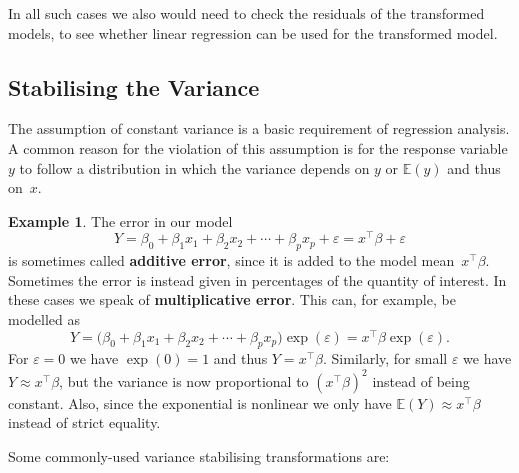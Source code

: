 \documentclass[
  a4paper,
]{article}
\theoremstyle{definition}
\theoremstyle{definition}
\newtheorem{example}{Example}[section]
\theoremstyle{definition}
\theoremstyle{definition}
\theoremstyle{remark}
\begin{document}
In all such cases we also would need to check the residuals of the transformed
models, to see whether linear regression can be used for the transformed model.

\subsection{Stabilising the Variance}\label{stabilising-the-variance}

The assumption of constant variance is a basic requirement of regression
analysis. A common reason for the violation of this assumption is for the
response variable \(y\) to follow a distribution in which the variance depends
on \(y\) or \(\mathbb{E}(y)\) and thus on~\(x\).

\begin{example}
The error in our model
\begin{equation*}
  Y
  = \beta_0 + \beta_1 x_1 + \beta_2 x_2 + \cdots + \beta_p x_p + \varepsilon
  = x^\top \beta + \varepsilon
\end{equation*}
is sometimes called \textbf{additive error}, since it is added to the model
mean~\(x^\top\beta\). Sometimes the error is instead given in percentages of the
quantity of interest. In these cases we speak of \textbf{multiplicative error}.
This can, for example, be modelled as
\begin{equation*}
  Y
  = \bigl(\beta_0 + \beta_1 x_1 + \beta_2 x_2 + \cdots + \beta_p x_p\bigr) \exp(\varepsilon)
  = x^\top \beta \exp(\varepsilon).
\end{equation*}
For \(\varepsilon= 0\) we have \(\exp(0) = 1\) and thus \(Y = x^\top \beta\). Similarly,
for small \(\varepsilon\) we have \(Y \approx x^\top \beta\), but the variance is now
proportional to \((x^\top\beta)^2\) instead of being constant. Also, since the
exponential is nonlinear we only have \(\mathbb{E}(Y) \approx x^\top\beta\) instead of
strict equality.
\end{example}

Some commonly-used variance stabilising transformations are:
\end{document}
